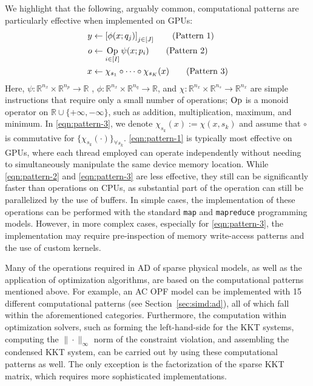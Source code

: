 We highlight that the following, arguably common, computational
patterns are particularly effective when implemented on GPUs:
\begin{align}
  y&\leftarrow \left[\phi(x; q_j)\right]_{j\in [J]}\tag{Pattern 1}\label{eqn:pattern-1}\\
  o&\leftarrow  \mathop{\rm{Op}}_{i\in [I]} \psi(x;p_i) \tag{Pattern 2}\label{eqn:pattern-2}\\
  x&\leftarrow  \chi_{s_1}\circ\cdots\circ \chi_{s_K}(x) \tag{Pattern 3}\label{eqn:pattern-3}
\end{align}
Here, $\psi:\mathbb{R}^{n_x}\times \mathbb{R}^{n_{p}}\rightarrow
\mathbb{R}$ , $\phi:\mathbb{R}^{n_x}\times
\mathbb{R}^{n_{q}}\rightarrow \mathbb{R}$, and
$\chi:\mathbb{R}^{n_x}\times \mathbb{R}^{n_{s}}\rightarrow
\mathbb{R}^{n_x}$ are simple instructions that require only a small number
of operations; $\mathop{\rm{Op}}$ is a monoid operator on
$\mathbb{R}\cup\{+\infty,-\infty\}$, such as addition, multiplication,
maximum, and minimum. In \ref{eqn:pattern-3}, we denote $\chi_{s_k}(x):=\chi(x,s_k)$ and
assume that $\circ$ is commutative for $\{\chi_{s_k}(\cdot)\}_{\forall
s_k}$. \ref{eqn:pattern-1} is typically most effective on GPUs, where
each thread employed can operate independently without needing to
simultaneously manipulate the same device memory location. While
\ref{eqn:pattern-2} and \ref{eqn:pattern-3} are less effective,
they still can be significantly
faster than operations on CPUs, as substantial part of the operation
can still be parallelized by the use of buffers. In simple cases, the
implementation of these operations can be performed with the standard
{\tt map} and {\tt mapreduce} programming models. However, in more
complex cases, especially for \ref{eqn:pattern-3}, the implementation
may require pre-inspection of memory write-access patterns and the use
of custom kernels.

Many of the operations required in AD of sparse physical models, as
well as the application of optimization algorithms, are based on the
computational patterns mentioned above. For example, an AC OPF model
can be implemented with 15 different computational patterns (see
Section~\ref{sec:simd:ad}), all of which fall within the
aforementioned categories. Furthermore, the computation within
optimization solvers, such as forming the left-hand-side for the KKT
systems, computing the $\|\cdot\|_\infty$ norm of the constraint
violation, and assembling the condensed KKT system, can be carried out
by using these computational patterns as well. The only exception is
the factorization of the sparse KKT matrix, which requires more
sophisticated implementations.

